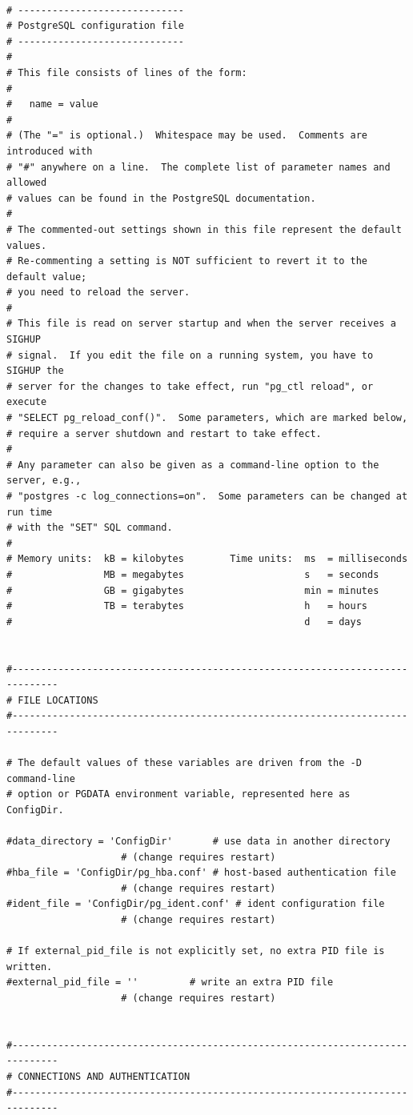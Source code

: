 \vspace{-0.5cm}
\begin{verbatim}
 
# -----------------------------
# PostgreSQL configuration file
# -----------------------------
#
# This file consists of lines of the form:
#
#   name = value
#
# (The "=" is optional.)  Whitespace may be used.  Comments are introduced with
# "#" anywhere on a line.  The complete list of parameter names and allowed
# values can be found in the PostgreSQL documentation.
#
# The commented-out settings shown in this file represent the default values.
# Re-commenting a setting is NOT sufficient to revert it to the default value;
# you need to reload the server.
#
# This file is read on server startup and when the server receives a SIGHUP
# signal.  If you edit the file on a running system, you have to SIGHUP the
# server for the changes to take effect, run "pg_ctl reload", or execute
# "SELECT pg_reload_conf()".  Some parameters, which are marked below,
# require a server shutdown and restart to take effect.
#
# Any parameter can also be given as a command-line option to the server, e.g.,
# "postgres -c log_connections=on".  Some parameters can be changed at run time
# with the "SET" SQL command.
#
# Memory units:  kB = kilobytes        Time units:  ms  = milliseconds
#                MB = megabytes                     s   = seconds
#                GB = gigabytes                     min = minutes
#                TB = terabytes                     h   = hours
#                                                   d   = days


#------------------------------------------------------------------------------
# FILE LOCATIONS
#------------------------------------------------------------------------------

# The default values of these variables are driven from the -D command-line
# option or PGDATA environment variable, represented here as ConfigDir.

#data_directory = 'ConfigDir'		# use data in another directory
					# (change requires restart)
#hba_file = 'ConfigDir/pg_hba.conf'	# host-based authentication file
					# (change requires restart)
#ident_file = 'ConfigDir/pg_ident.conf'	# ident configuration file
					# (change requires restart)

# If external_pid_file is not explicitly set, no extra PID file is written.
#external_pid_file = ''			# write an extra PID file
					# (change requires restart)


#------------------------------------------------------------------------------
# CONNECTIONS AND AUTHENTICATION
#------------------------------------------------------------------------------


\end{verbatim}
